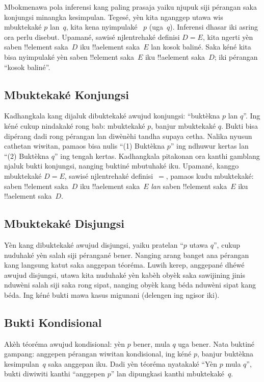 \documentclass[../../../include/open-logic-section]{subfiles}
\begin{document}
Mbokmenawa pola inferensi kang paling prasaja yaiku njupuk siji
pérangan saka konjungsi minangka kesimpulan. Tegesé, yèn kita
nganggep utawa wis mbuktekaké $p$ lan~$q$, kita kena nyimpulaké
~$p$ (uga~$q$). Inferensi dhasar iki asring ora perlu disebut.
Upamané, sawisé njlentrehaké definisi $D = E$, kita ngerti yèn
saben !!{element} saka~$D$ iku !!a{element} saka~$E$ lan kosok
baliné. Saka kéné kita bisa nyimpulaké yèn saben !!{element}
saka~$E$ iku !!a{element} saka~$D$; iki pérangan ``kosok baliné''.

\subsection{Mbuktekaké Konjungsi}

Kadhangkala kang dijaluk dibuktekaké awujud konjungsi:
``buktèkna $p$ lan $q$''. Ing kéné cukup nindakaké rong bab:
mbuktekaké $p$, banjur mbuktekaké $q$. Bukti bisa dipérang dadi
rong pérangan lan diwènèhi tandha supaya cetha. Nalika nyusun
cathetan wiwitan, pamaos bisa nulis ``(1) Buktèkna $p$''
ing ndhuwur kertas lan ``(2) Buktèkna $q$'' ing tengah kertas.
Kadhangkala pitakonan ora kanthi gamblang njaluk bukti konjungsi,
nanging buktiné mbutuhaké iku. Upamané, kanggo mbuktekaké $D = E$,
sawisé njlentrehaké definisi~$=$, pamaos kudu mbuktekaké:
saben !!{element} saka~$D$ iku !!a{element} saka~$E$
\emph{lan} saben !!{element} saka~$E$ iku !!a{element} saka~$D$.

\subsection{Mbuktekaké Disjungsi}

Yèn kang dibuktekaké awujud disjungsi, yaiku pratelan ``$p$
utawa $q$'', cukup nuduhaké yèn salah siji pérangané bener.
Nanging arang banget ana pérangan kang langsung katut saka
anggepan téoréma. Luwih kerep, anggepané dhéwé awujud disjungsi,
utawa kita nuduhaké yèn kabèh obyèk saka sawijining jinis nduwèni
salah siji saka rong sipat, nanging obyèk kang béda nduwèni
sipat kang béda. Ing kéné bukti mawa kasus migunani (delengen
ing ngisor iki).

\subsection{Bukti Kondisional}

Akèh téoréma awujud kondisional: yèn $p$ bener, mula $q$ uga
bener. Nata buktiné gampang: anggepen pérangan wiwitan kondisional,
ing kéné $p$, banjur buktèkna kesimpulan~$q$ saka anggepan iku.
Dadi yèn téoréma nyatakaké ``Yèn $p$ mula $q$'', bukti diwiwiti
kanthi ``anggepen $p$'' lan dipungkasi kanthi mbuktekaké~$q$.
\end{document}
